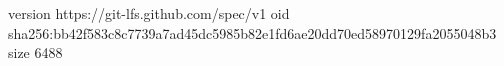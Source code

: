 version https://git-lfs.github.com/spec/v1
oid sha256:bb42f583c8c7739a7ad45dc5985b82e1fd6ae20dd70ed58970129fa2055048b3
size 6488
